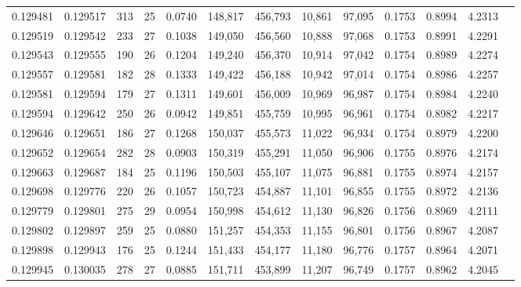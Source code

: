 \begin{tabular}{rrrrrrrrrrrrr}
0.129481 & 0.129517 &   313 &  25 &                                     0.0740 & 148,817 & 456,793 &  10,861 &  97,095 & 0.1753 & 0.8994 & 4.2313 \\
0.129519 & 0.129542 &   233 &  27 &                                     0.1038 & 149,050 & 456,560 &  10,888 &  97,068 & 0.1753 & 0.8991 & 4.2291 \\
0.129543 & 0.129555 &   190 &  26 &                                     0.1204 & 149,240 & 456,370 &  10,914 &  97,042 & 0.1754 & 0.8989 & 4.2274 \\
0.129557 & 0.129581 &   182 &  28 &                                     0.1333 & 149,422 & 456,188 &  10,942 &  97,014 & 0.1754 & 0.8986 & 4.2257 \\
0.129581 & 0.129594 &   179 &  27 &                                     0.1311 & 149,601 & 456,009 &  10,969 &  96,987 & 0.1754 & 0.8984 & 4.2240 \\
0.129594 & 0.129642 &   250 &  26 &                                     0.0942 & 149,851 & 455,759 &  10,995 &  96,961 & 0.1754 & 0.8982 & 4.2217 \\
0.129646 & 0.129651 &   186 &  27 &                                     0.1268 & 150,037 & 455,573 &  11,022 &  96,934 & 0.1754 & 0.8979 & 4.2200 \\
0.129652 & 0.129654 &   282 &  28 &                                     0.0903 & 150,319 & 455,291 &  11,050 &  96,906 & 0.1755 & 0.8976 & 4.2174 \\
0.129663 & 0.129687 &   184 &  25 &                                     0.1196 & 150,503 & 455,107 &  11,075 &  96,881 & 0.1755 & 0.8974 & 4.2157 \\
0.129698 & 0.129776 &   220 &  26 &                                     0.1057 & 150,723 & 454,887 &  11,101 &  96,855 & 0.1755 & 0.8972 & 4.2136 \\
0.129779 & 0.129801 &   275 &  29 &                                     0.0954 & 150,998 & 454,612 &  11,130 &  96,826 & 0.1756 & 0.8969 & 4.2111 \\
0.129802 & 0.129897 &   259 &  25 &                                     0.0880 & 151,257 & 454,353 &  11,155 &  96,801 & 0.1756 & 0.8967 & 4.2087 \\
0.129898 & 0.129943 &   176 &  25 &                                     0.1244 & 151,433 & 454,177 &  11,180 &  96,776 & 0.1757 & 0.8964 & 4.2071 \\
0.129945 & 0.130035 &   278 &  27 &                                     0.0885 & 151,711 & 453,899 &  11,207 &  96,749 & 0.1757 & 0.8962 & 4.2045 \\

\end{tabular}
